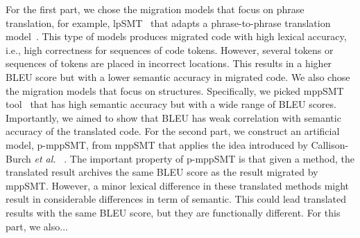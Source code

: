 For the first part, we chose the migration models that focus on phrase
translation, for example, lpSMT~\cite{fse13-nier} that adapts a
phrase-to-phrase translation model~\cite{phrasal10}. This type of
models produces migrated code with high lexical accuracy, i.e., high
correctness for sequences of code tokens. However, several tokens or
sequences of tokens are placed in incorrect locations.  This results
in a higher BLEU score but with a lower semantic accuracy in migrated
code. We also chose the migration models that focus on
structures. Specifically, we picked mppSMT tool~\cite{ase15} that has
high semantic accuracy but with a wide range of BLEU
scores. Importantly, we aimed to show that BLEU has weak correlation
with semantic accuracy of the translated code. 
%
%
For the second part, we construct an artificial model, p-mppSMT, from mppSMT
\cite{ase15} that applies the idea introduced by Callison-Burch {\em et al.}
~\cite{Callison}. The important property of p-mppSMT is that given a method,
 the translated result archives the same BLEU score as the result migrated 
by mppSMT. However, a minor lexical difference in these translated methods 
might result in considerable differences in term of semantic. This could lead translated results with the same BLEU score, but they are functionally different. For this part, we also...

